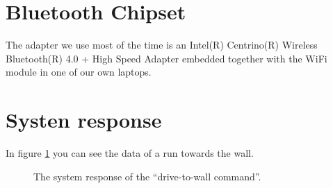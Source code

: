 \documentclass[final]{scrreprt} %
\begin{document}
\section{Bluetooth Chipset}
The adapter we use most of the time is an Intel(R) Centrino(R) Wireless Bluetooth(R) 4.0 + High Speed Adapter embedded together with the WiFi module in one of our own laptops.

\section{Systen response}
In figure \ref{fig:system-response} you can see the data of a run towards the wall.
\begin{figure}[H]
	\centering
    	\setlength\figureheight{4cm}
    	\setlength{}
    	    	
    	\caption{The system response of the “drive-to-wall command”.}
    	\label{fig:system-response}
\end{figure}
\end{document}
